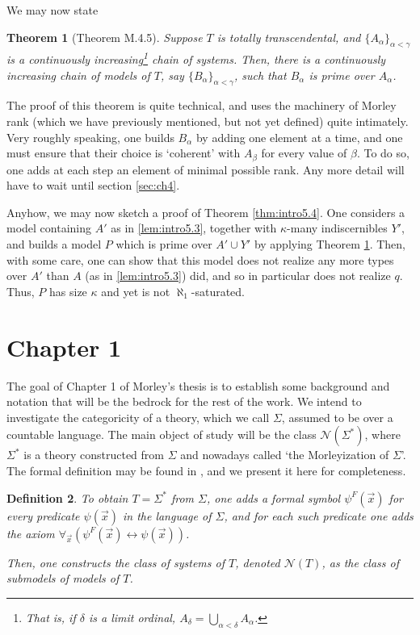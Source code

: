 \documentclass{article}
\newtheorem{theorem}{Theorem}[section]
\newtheorem{definition}[theorem]{Definition}
\theoremstyle{nonumberplain}
\newcommand{\calN}{\mathcal{N}}
\begin{document}
We may now state
\begin{theorem}[Theorem M.4.5]\label{thm:intro4.5}
Suppose $T$ is totally transcendental, and $\{A_\alpha\}_{\alpha < \gamma}$ is a continuously increasing\footnote{That is, if $\delta$ is a limit ordinal, $A_\delta = \bigcup_{\alpha < \delta} A_\alpha$.} chain of systems. Then, there is a continuously increasing chain of models of $T$, say $\{B_\alpha\}_{\alpha < \gamma}$, such that $B_\alpha$ is prime over $A_\alpha$.
\end{theorem}

The proof of this theorem is quite technical, and uses the machinery of Morley rank (which we have previously mentioned, but not yet defined) quite intimately. Very roughly speaking, one builds $B_\alpha$ by adding one element at a time, and one must ensure that their choice is `coherent' with $A_\beta$ for every value of $\beta$. To do so, one adds at each step an element of minimal possible rank. Any more detail will have to wait until section \ref{sec:ch4}.

Anyhow, we may now sketch a proof of Theorem \ref{thm:intro5.4}. One considers a model containing $A'$ as in \ref{lem:intro5.3}, together with $\kappa$-many indiscernibles $Y'$, and builds a model $P$ which is prime over $A' \cup Y'$ by applying Theorem \ref{thm:intro4.5}. Then, with some care, one can show that this model does not realize any more types over $A'$ than $A$ (as in \ref{lem:intro5.3}) did, and so in particular does not realize $q$. Thus, $P$ has size $\kappa$ and yet is not $\aleph_1$-saturated.

\section{Chapter 1}\label{sec:ch1}

The goal of Chapter 1 of Morley's thesis is to establish some background and notation that will be the bedrock for the rest of the work. We intend to investigate the categoricity of a theory, which we call $\Sigma$, assumed to be over a countable language. The main object of study will be the class $\calN(\Sigma^*)$, where $\Sigma^*$ is a theory constructed from $\Sigma$ and nowadays called `the Morleyization of $\Sigma$'. The formal definition may be found in \cite{morley}, and we present it here for completeness.

\begin{definition}
To obtain $T = \Sigma^*$ from $\Sigma$, one adds a formal symbol $\psi^F(\vec x)$ for every predicate $\psi(\vec x)$ in the language of $\Sigma$, and for each such predicate one adds the axiom $\forall_{\vec x} (\psi^F(\vec x) \leftrightarrow \psi(\vec x))$.

Then, one constructs the class of \emph{systems of $T$}, denoted $\calN(T)$, as the class of submodels of models of $T$.
\end{definition}
\end{document}
